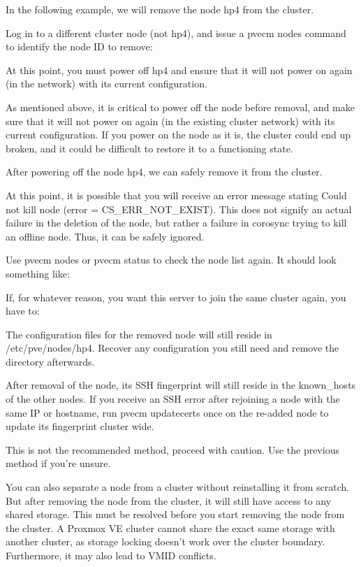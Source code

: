 In the following example, we will remove the node hp4 from the cluster.

Log in to a different cluster node (not hp4), and issue a pvecm nodes command to identify the node ID to remove:

At this point, you must power off hp4 and ensure that it will not power on again (in the network) with its current configuration.

As mentioned above, it is critical to power off the node before removal, and make sure that it will not power on again (in the existing cluster network) with its current configuration. If you power on the node as it is, the cluster could end up broken, and it could be difficult to restore it to a functioning state.

After powering off the node hp4, we can safely remove it from the cluster.

At this point, it is possible that you will receive an error message stating Could not kill node (error = CS_ERR_NOT_EXIST). This does not signify an actual failure in the deletion of the node, but rather a failure in corosync trying to kill an offline node. Thus, it can be safely ignored.

Use pvecm nodes or pvecm status to check the node list again. It should look something like:

If, for whatever reason, you want this server to join the same cluster again, you have to:

The configuration files for the removed node will still reside in /etc/pve/nodes/hp4. Recover any configuration you still need and remove the directory afterwards.

After removal of the node, its SSH fingerprint will still reside in the known_hosts of the other nodes. If you receive an SSH error after rejoining a node with the same IP or hostname, run pvecm updatecerts once on the re-added node to update its fingerprint cluster wide.

This is not the recommended method, proceed with caution. Use the previous method if you’re unsure.

You can also separate a node from a cluster without reinstalling it from scratch. But after removing the node from the cluster, it will still have access to any shared storage. This must be resolved before you start removing the node from the cluster. A Proxmox VE cluster cannot share the exact same storage with another cluster, as storage locking doesn’t work over the cluster boundary. Furthermore, it may also lead to VMID conflicts.

